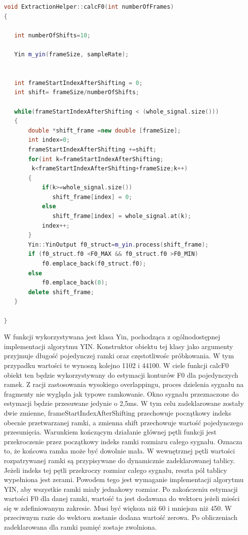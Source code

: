 \documentclass[a4paper,12 pt]{article}
\begin{document}
\FloatBarrier

\begin{lstlisting}[caption={Przedstawienie sposobu dokonywania podziału na ramki, wraz z zastosowaniem overlappingu},label={lst:label},language=C++]
void ExtractionHelper::calcF0(int numberOfFrames)
{

   int numberOfShifts=10;

   Yin m_yin(frameSize, sampleRate);


   int frameStartIndexAfterShifting = 0;
   int shift= frameSize/numberOfShifts;

   while(frameStartIndexAfterShifting < (whole_signal.size()))
   {
       double *shift_frame =new double [frameSize];
       int index=0;
       frameStartIndexAfterShifting +=shift;
       for(int k=frameStartIndexAfterShifting;
		k<frameStartIndexAfterShifting+frameSize;k++)
       {
           if(k>=whole_signal.size())
              shift_frame[index] = 0;
           else
              shift_frame[index] = whole_signal.at(k);
           index++;
       }
       Yin::YinOutput f0_struct=m_yin.process(shift_frame);
       if (f0_struct.f0 <F0_MAX && f0_struct.f0 >F0_MIN)
           f0.emplace_back(f0_struct.f0);
       else
           f0.emplace_back(0);
       delete shift_frame;
   }

}
\end{lstlisting}
W funkcji wykorzystywana jest klasa Yin, pochodząca z ogólnodostępnej implementacji algorytmu YIN. Konstruktor obiektu tej klasy jako argumenty przyjmuje długość pojedynczej ramki oraz częstotliwośc próbkowania. W tym przypadku wartości te wynoszą kolejno 1102 i 44100. 
W ciele funkcji calcF0 obiekt ten będzie wykorzystywany do estymacji konturów F0 dla pojedynczych ramek. 
Z racji zastosowania wysokiego overlappingu, proces dzielenia sygnału na fragmenty nie wygląda jak typowe ramkowanie. Okno sygnału przeznaczone do estymacji będzie przesuwane jedynie o 2,5ms.
W tym celu zadeklarowane zostały dwie zmienne, frameStartIndexAfterShifting przechowuje początkowy indeks obecnie przetwarzanej ramki, a zmienna shift przechowuje wartość pojedynczego przesunięcia.
Warunkiem kończącym działanie głównej pętli funkcji jest przekroczenie przez początkowy indeks ramki rozmiaru całego sygnału. Oznacza to, że końcowa ramka może być dowolnie mała.
W wewnętrznej pętli wartości rozpatrywanej ramki są przypisywane do dynamicznie zadeklarowanej tablicy. Jeżeli indeks tej pętli przekroczy rozmiar całego sygnału, reszta pól tablicy wypełniona jest zerami. Powodem tego jest wymaganie implementacji algorytmu YIN, aby wszystkie ramki miały jednakowy rozmiar.
Po zakończeniu estymacji wartości F0 dla danej ramki, wartość ta jest dodawana do wektoru jeżeli mieści się w zdefiniowanym zakresie. Musi być większa niż 60 i mniejsza niż 450. W przeciwnym razie do wektoru zostanie dodana wartość zerowa. Po obliczeniach zadeklarowana dla ramki pamięć zostaje zwolniona.
\end{document}
